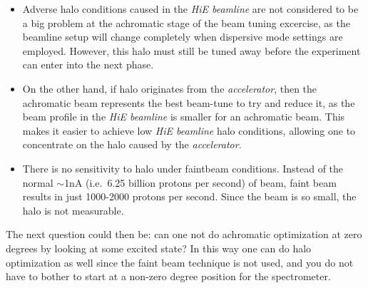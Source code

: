 \documentclass[11pt]{report}
\begin{document}
\begin{itemize}
\item Adverse halo conditions caused in the {\it HiE beamline} are not considered 
to be a big problem at the achromatic stage of the beam tuning excercise, 
as the beamline setup will change completely when dispersive mode settings are employed. 
However, this halo must still be tuned away before the experiment can enter into the next phase.

\item On the other hand, if halo originates from the {\it accelerator}, then the achromatic beam
represents the best beam-tune to try and reduce it, as the beam profile 
in the {\it HiE beamline} is smaller for an achromatic beam.
This makes it easier to achieve low {\it HiE beamline} halo conditions, allowing one to
concentrate on the halo caused by the {\it accelerator}.

\item There is no sensitivity to halo under faintbeam conditions.
Instead of the normal $\sim$1nA (i.e.~6.25 billion protons per second) of beam, 
faint beam results in just 1000-2000 protons per second. Since the beam is so small, the
halo is not measurable.

\end{itemize}


\noindent The next question could then be: can one not do 
achromatic optimization at zero degrees by looking at some
excited state? In this way one can do halo optimization as well
since the faint beam technique is not used, and you do not have 
to bother to start at a non-zero degree position for the spectrometer.
\end{document}
